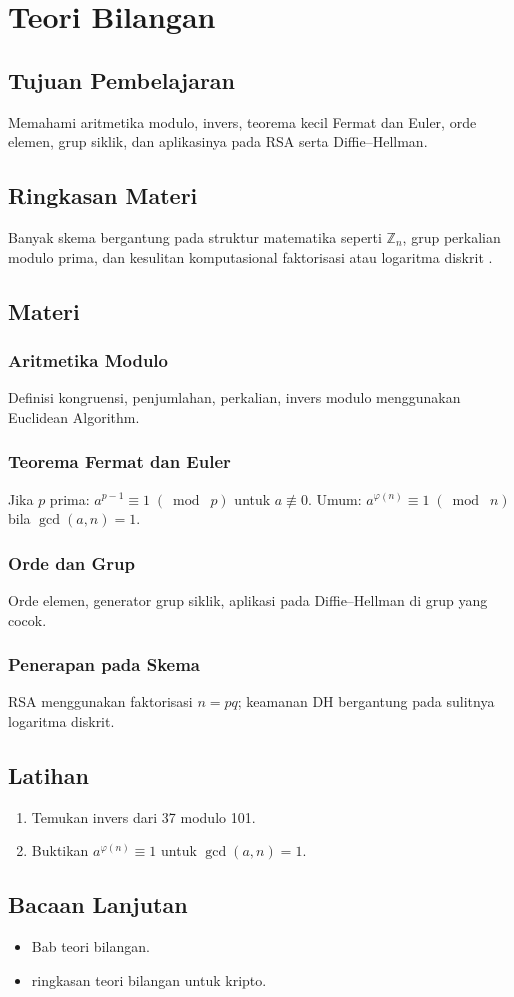 \documentclass[../main.tex]{subfiles}
\begin{document}
\chapter{Teori Bilangan}\label{ch:teori-bilangan}
\section{Tujuan Pembelajaran}
Memahami aritmetika modulo, invers, teorema kecil Fermat dan Euler, orde elemen, grup siklik, dan aplikasinya pada RSA serta Diffie--Hellman.

\section{Ringkasan Materi}
Banyak skema bergantung pada struktur matematika seperti \(\mathbb{Z}_n\), grup perkalian modulo prima, dan kesulitan komputasional faktorisasi atau logaritma diskrit \citep{hac,bonehshoup}.

\section{Materi}
\subsection{Aritmetika Modulo}
Definisi kongruensi, penjumlahan, perkalian, invers modulo menggunakan Euclidean Algorithm.

\subsection{Teorema Fermat dan Euler}
Jika \(p\) prima: \(a^{p-1}\equiv 1\; (\bmod\; p)\) untuk \(a\not\equiv 0\). Umum: \(a^{\varphi(n)}\equiv 1\; (\bmod\; n)\) bila \(\gcd(a,n)=1\).

\subsection{Orde dan Grup}
Orde elemen, generator grup siklik, aplikasi pada Diffie--Hellman di grup yang cocok.

\subsection{Penerapan pada Skema}
RSA menggunakan faktorisasi \(n=pq\); keamanan DH bergantung pada sulitnya logaritma diskrit.

\section{Latihan}
\begin{enumerate}
  \item Temukan invers dari 37 modulo 101.
  \item Buktikan \(a^{\varphi(n)}\equiv 1\) untuk \(\gcd(a,n)=1\).
\end{enumerate}

\section{Bacaan Lanjutan}
\begin{itemize}
  \item \citep{hac} Bab teori bilangan.
  \item \citep{bonehshoup} ringkasan teori bilangan untuk kripto.
\end{itemize}
\end{document}
